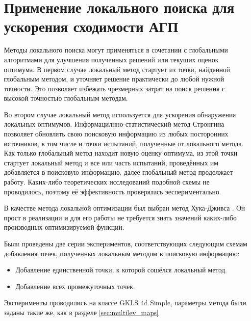 \section{Применение локального поиска для ускорения сходимости АГП}
Методы локального поиска могут применяться в сочетании с глобальными алгоритмами для улучшения полученных решений или текущих оценок оптимума.
В первом случае локальный метод стартует из точки, найденной глобальным методом, и уточняет решение практически до любой нужной точности. Это
позволяет избежать чрезмерных затрат на поиск решения с высокой точностью глобальным методам.
\par
Во втором случае локальный метод используется для ускорения обнаружения локальных оптимумов.
Информацилнно-статистический метод Стронгина позволяет обновлять свою поисковую информацию из любых посторонних источников, в том числе и точки испытаний,
полученные от локального метода.
Как только глобальный метод находит новую оценку оптимума, из этой точки стартует локальный метод и все или часть испытаний, проведённых им
добавляется в поисковую информацию, далее глобальный метод продолжает работу. Каких-либо теоретических исследований подобной схемы не проводилось, поэтому её эффективность проверялась эеспериментально.
\par
В качестве метода локальной оптимизации был выбран метод Хука-Дживса \cite{himmelblau}. Он прост в реализации и для его работы не требуется знать значений
каких-либо производных оптимизируемой функции.
\par
Были проведены две серии экспериментов, соответствующих следующим схемам добавления точек, полученных локальным методом в поисковую информацию:
\begin{itemize}
		\item Добавление единственной точки, к которой сошёлся локальный метод.
    \item Добавление всех промежуточных точек.
\end{itemize}
Эксперименты проводились на классе GKLS 4d Simple, параметры метода были заданы такие же, как в разделе \ref{sec:multilev_maps}
